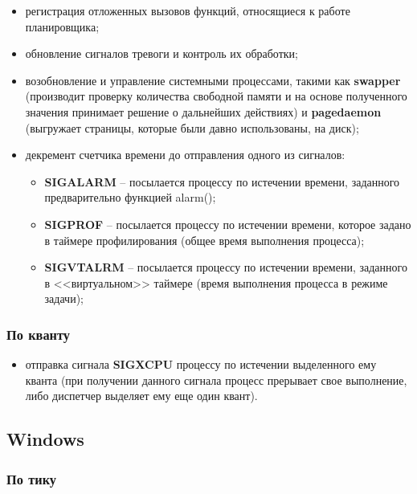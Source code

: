 \begin{itemize}
	\item регистрация отложенных вызовов функций, от­носящиеся к работе планировщика;
	\item обновление сигналов тревоги и контроль их обработки;
	\item возобновление и управление системными процессами, такими как \textbf{swapper} (производит проверку количества свободной памяти и на основе полученного значения принимает решение о дальнейших действиях) и \textbf{pagedaemon} (выгружает страницы, которые были давно использованы, на диск);

	\item декремент счетчика времени до отправления одного из сигналов:
	
	\begin{itemize}
		\item \textbf{SIGALARM} -- посылается процессу по истечении времени, заданного предварительно функцией alarm();
		\item \textbf{SIGPROF} -- посылается процессу по истечении времени, которое задано в таймере профилирования (общее время выполнения процесса);
		\item \textbf{SIGVTALRM} -- посылается процессу по истечении времени, заданного в <<виртуальном>> таймере (время выполнения процесса в режиме задачи);
	\end{itemize}
	
\end{itemize}

\subsubsection*{По кванту}

\begin{itemize}
	\item 	отправка сигнала \textbf{SIGXCPU} процессу по истечении выделенного ему кванта (при получении данного сигнала процесс прерывает свое выполнение, либо диспетчер выделяет ему еще один квант).
\end{itemize}


\subsection{Windows}

\subsubsection*{По тику}

